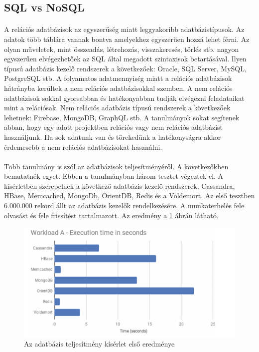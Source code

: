\subsection{SQL vs NoSQL}
\paragraph{}
A relációs adatbázisok az egyszerűség miatt leggyakoribb adatbázistípusok. Az adatok több táblára vannak bontva amelyekhez egyszerűen hozzá lehet férni. Az olyan műveletek, mint összeadás, létrehozás, visszakeresés, törlés stb. nagyon egyszerűen elvégezhetőek az SQL által megadott szintaxisok betartásával. Ilyen típusú adatbázis kezelő rendszerek a következőek: Oracle, SQL Server, MySQL, PostgreSQL stb. A folyamatos adatmennyiség miatt a relációs adatbázisok hátrányba kerültek a nem relációs adatbázisokkal szemben. A nem relációs adatbázisok sokkal gyorsabban és hatékonyabban tudják elvégezni feladataikat mint a relációsak. Nem relációs adatbázis típusú rendszerek a következőek lehetnek: Firebase, MongoDB, GraphQL stb.\cite{gupta2017nosql} A tanulmányok sokat segítenek abban, hogy egy adott projektben relációs vagy nem relációs adatbázist használjunk. Ha sok adatunk van és törekedünk a hatékonyságra akkor érdemesebb a nem relációs adatbázisokat használni. 
\paragraph{}
Több tanulmány is szól az adatbázisok teljesítményéről. A következőkben bemutatnék egyet. Ebben a tanulmányban három tesztet végeztek el. A kísérletben szerepelnek a következő adatbázis kezelő rendszerek: Cassandra, HBase, Memcached, MongoDb, OrientDB, Redis és a Voldemort.\cite{martins2019study} Az első tesztben 6.000.000 rekord állt az adatbázis kezelők rendelkezésére. A munkaterhelés fele olvasást és fele frissítést tartalmazott. Az eredmény a \ref{fig:performance_a} ábrán látható.
	
\begin{figure}
	\centering
	\includegraphics[scale=0.6]{figures/images/performance_a.png}
	\caption{Az adatbázis teljesítmény kísérlet első eredménye \cite{martins2019study}}
	\label{fig:performance_a}
\end{figure}

